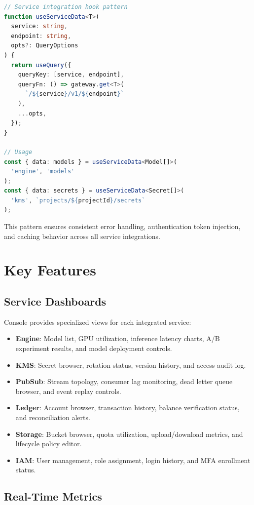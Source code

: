 \documentclass[11pt,twocolumn]{article}
\begin{document}
\begin{lstlisting}[language=TypeScript]
// Service integration hook pattern
function useServiceData<T>(
  service: string,
  endpoint: string,
  opts?: QueryOptions
) {
  return useQuery({
    queryKey: [service, endpoint],
    queryFn: () => gateway.get<T>(
      `/${service}/v1/${endpoint}`
    ),
    ...opts,
  });
}

// Usage
const { data: models } = useServiceData<Model[]>(
  'engine', 'models'
);
const { data: secrets } = useServiceData<Secret[]>(
  'kms', `projects/${projectId}/secrets`
);
\end{lstlisting}

This pattern ensures consistent error handling, authentication token injection, and caching behavior across all service integrations.

\section{Key Features}

\subsection{Service Dashboards}

Console provides specialized views for each integrated service:

\begin{itemize}
    \item \textbf{Engine}: Model list, GPU utilization, inference latency charts, A/B experiment results, and model deployment controls.
    \item \textbf{KMS}: Secret browser, rotation status, version history, and access audit log.
    \item \textbf{PubSub}: Stream topology, consumer lag monitoring, dead letter queue browser, and event replay controls.
    \item \textbf{Ledger}: Account browser, transaction history, balance verification status, and reconciliation alerts.
    \item \textbf{Storage}: Bucket browser, quota utilization, upload/download metrics, and lifecycle policy editor.
    \item \textbf{IAM}: User management, role assignment, login history, and MFA enrollment status.
\end{itemize}

\subsection{Real-Time Metrics}
\end{document}
